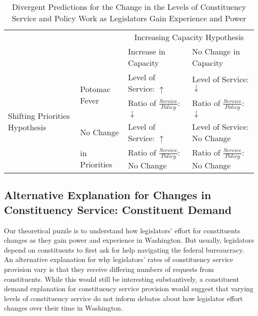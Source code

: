 \documentclass[12pt]{article}
\begin{document}
\begin{table}[]
\caption{Divergent Predictions for the Change in the Levels of Constituency Service and Policy Work as Legislators Gain Experience and Power}\label{t:theory}

\begin{tabular}{p{.15\linewidth}|p{.20\linewidth}|p{.32\linewidth}|p{.33\linewidth}|}
\hline
\multicolumn{2}{l}{\multirow{2}{*}{}} & \multicolumn{2}{|c|}{Increasing Capacity Hypothesis} \\ \cline{3-4}
\multicolumn{2}{l|}{}    &  Increase in Capacity  &   No Change in Capacity \\ \cline{1-4} 
\multirow{4}{1.8cm}{Shifting Priorities Hypothesis}  &   \multirow{2}{2cm}{Potomac Fever}   &  Level of Service: $\uparrow$  &  Level of Service: $\downarrow$  \\ 
& &  Ratio of $\frac{Service}{Policy}$: $\downarrow$   &   Ratio of $\frac{Service}{Policy}$: $\downarrow$  \\ \cline{2-4}
 &  No Change    &  Level of Service: $\uparrow$  & Level of Service: No Change \\ 
 & in Priorities &   Ratio of $\frac{Service}{Policy}$: No Change  & Ratio of $\frac{Service}{Policy}$: No Change\\ \hline
\end{tabular}
\end{table}








\subsection{Alternative Explanation for Changes in Constituency Service: Constituent Demand}

Our theoretical puzzle is to understand how legislators' effort for constituents changes as they gain power and experience in Washington. But usually, legislators depend on constituents to first ask for help navigating the federal bureaucracy. An alternative explanation for why legislators' rates of constituency service provision vary is that they receive differing numbers of requests from constituents. While this would still be interesting substantively, a constituent demand explanation for constituency service provision would suggest that varying levels of constituency service do not inform debates about how legislator effort changes over their time in Washington. 
\end{document}
